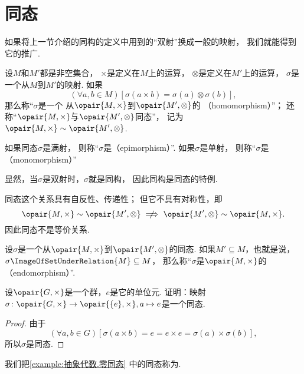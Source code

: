 \section{同态}
如果将上一节介绍的同构的定义中用到的“双射”换成一般的映射，
我们就能得到它的推广.

\begin{definition}
设\(M\)和\(M'\)都是非空集合，
\(\times\)是定义在\(M\)上的运算，
\(\otimes\)是定义在\(M'\)上的运算，
\(\sigma\)是一个从\(M\)到\(M'\)的映射.
如果\[
	(\forall a,b \in M)[
		\sigma(a \times b) = \sigma(a) \otimes \sigma(b)
	],
\]
那么称“\(\sigma\)是一个%
从\(\opair{M,\times}\)到\(\opair{M',\otimes}\)的%
（homomorphism）”；
还称“\(\opair{M,\times}\)与\(\opair{M',\otimes}\)同态”，
记为\(\opair{M,\times} \sim \opair{M',\otimes}\).
\end{definition}

如果同态\(\sigma\)是满射，
则称“\(\sigma\)是（epimorphism）”.
如果\(\sigma\)是单射，
则称“\(\sigma\)是（monomorphism）”

显然，当\(\sigma\)是双射时，\(\sigma\)就是同构，
因此同构是同态的特例.

同态这个关系具有自反性、传递性；
但它不具有对称性，即\[
	\opair{M,\times}\sim\opair{M',\otimes}
	\notimplies
	\opair{M',\otimes}\sim\opair{M,\times}.
\]
因此同态不是等价关系.

\begin{definition}
设\(\sigma\)是一个从\(\opair{M,\times}\)到\(\opair{M',\otimes}\)的同态.
如果\(M' \subseteq M\)，也就是说，\(\sigma\ImageOfSetUnderRelation{M}\subseteq M\)，
那么称“\(\sigma\)是\(\opair{M,\times}\)的（endomorphism）”.
\end{definition}

\begin{example}\label{example:抽象代数.零同态}
设\(\opair{G,\times}\)是一个群，\(e\)是它的单位元.
证明：映射\(\sigma\colon\opair{G,\times}\to\opair{\{e\},\times},a\mapsto e\)是一个同态.
\begin{proof}
由于\[
	(\forall a,b\in G)[
		\sigma(a \times b)
		= e
		= e \times e
		= \sigma(a) \times \sigma(b)
	],
\]
所以\(\sigma\)是同态.
\end{proof}
\end{example}
我们把\cref{example:抽象代数.零同态} 中的同态称为.


